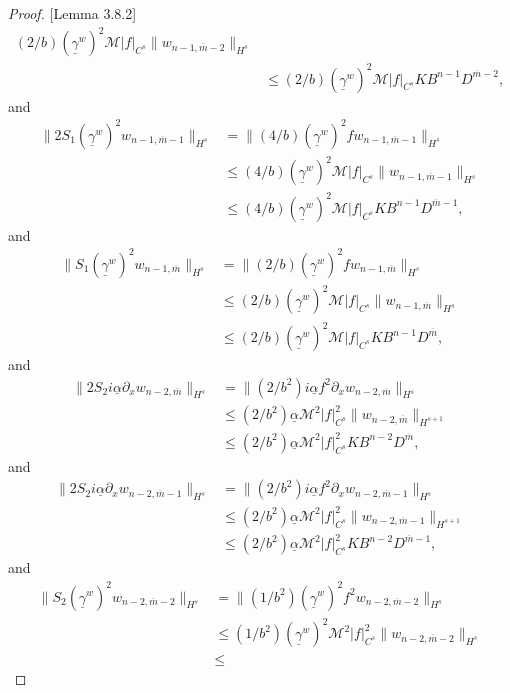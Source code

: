 \begin{proof}{[Lemma 3.8.2]}
\begin{align*}
(2/b)(\underline{\gamma}^w)^2\mathcal{M}|f|_{C^{s}}\|w_{n-1, \overline{m}-2}\|_{H^{s}}\\&\le
(2/b)(\underline{\gamma}^w)^2\mathcal{M}|f|_{C^{s}}KB^{n-1}D^{\overline{m}-2},
\end{align*}
and
\begin{align*}
\|2S_1(\underline{\gamma}^w)^2w_{n-1,\overline{m}-1}\|_{H^{s}}&=\|(4/b)(\underline{\gamma}^w)^2fw_{n-1,\overline{m}-1}\|_{H^{s}}\\&\le
(4/b)(\underline{\gamma}^w)^2\mathcal{M}|f|_{C^{s}}\|w_{n-1, \overline{m}-1}\|_{H^{s}}\\&\le
(4/b)(\underline{\gamma}^w)^2\mathcal{M}|f|_{C^{s}}KB^{n-1}D^{\overline{m}-1},
\end{align*}
and
\begin{align*}
\|S_1(\underline{\gamma}^w)^2w_{n-1,\overline{m}}\|_{H^{s}}&=\|(2/b)(\underline{\gamma}^w)^2fw_{n-1,\overline{m}}\|_{H^{s}}\\&\le
(2/b)(\underline{\gamma}^w)^2\mathcal{M}|f|_{C^{s}}\|w_{n-1, \overline{m}}\|_{H^{s}}\\&\le
(2/b)(\underline{\gamma}^w)^2\mathcal{M}|f|_{C^{s}}KB^{n-1}D^{\overline{m}},
\end{align*}
and
\begin{align*}
\|2S_2i\underline{\alpha}\partial_xw_{n-2,\overline{m}}\|_{H^{s}}&=\|(2/b^2)i\underline{\alpha}f^2\partial_xw_{n-2,\overline{m}}\|_{H^{s}}\\&\le
(2/b^2)\underline{\alpha}\mathcal{M}^2|f|_{C^{s}}^2\|w_{n-2, \overline{m}}\|_{H^{s+1}}\\&\le
(2/b^2)\underline{\alpha}\mathcal{M}^2|f|_{C^{s}}^2KB^{n-2}D^{\overline{m}},
\end{align*}
and
\begin{align*}
\|2S_2i\underline{\alpha}\partial_xw_{n-2,\overline{m}-1}\|_{H^{s}}&=\|(2/b^2)i\underline{\alpha}f^2\partial_xw_{n-2,\overline{m}-1}\|_{H^{s}}\\&\le
(2/b^2)\underline{\alpha}\mathcal{M}^2|f|_{C^{s}}^2\|w_{n-2, \overline{m}-1}\|_{H^{s+1}}\\&\le
(2/b^2)\underline{\alpha}\mathcal{M}^2|f|_{C^{s}}^2KB^{n-2}D^{\overline{m}-1},
\end{align*}
and
\begin{align*}
\|S_2(\underline{\gamma}^w)^2w_{n-2,\overline{m}-2}\|_{H^{s}}&=\|(1/b^2)(\underline{\gamma}^w)^2f^2w_{n-2,\overline{m}-2}\|_{H^{s}}\\&\le
(1/b^2)(\underline{\gamma}^w)^2\mathcal{M}^2|f|_{C^{s}}^2\|w_{n-2, \overline{m}-2}\|_{H^{s}}\\&\le

\end{align*}
\end{proof}
